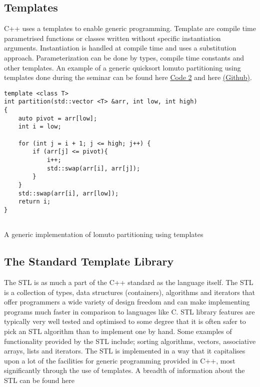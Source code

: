 \documentclass[conference, a4paper]{IEEEtran}
\begin{document}
\subsection{Templates}

C++ uses a templates to enable generic programming. Template are compile time parametrised functions or classes written without specific instantiation arguments. Instantiation is handled at compile time and uses a substitution approach. Parameterization can be done by types, compile time constants and other templates. An example of a generic quicksort lomuto partitioning using templates done during the seminar can be found here \hyperref[listing:2]{Code 2} and here \href{https://github.com/qasimwarraich/PLP/blob/master/A2/Task1/quicksort/quicksort.cpp}{(Github)}.


\begin{listing}[htb]
\begin{verbatim}
template <class T>
int partition(std::vector <T> &arr, int low, int high)
{
    auto pivot = arr[low];
    int i = low;

    for (int j = i + 1; j <= high; j++) {
        if (arr[j] <= pivot){
            i++;
            std::swap(arr[i], arr[j]);
        }
    }
    std::swap(arr[i], arr[low]);
    return i; 
}
        
    \end{verbatim}
    
    \caption{A generic implementation of lomuto partitioning using templates}
\label{listing:2}
\end{listing}

\subsection{The Standard Template Library}
The STL is as much a part of the C++ standard as the language itself. The STL is a collection of types, data structures (containers), algorithms and iterators that offer programmers a wide variety of design freedom and can make implementing programs much faster in comparison to languages like C. STL library features are typically very well tested and optimised to some degree that it is often safer to pick an STL algorithm than to implement one by hand. Some examples of functionality provided by the STL include; sorting algorithms, vectors, associative arrays, lists and iterators. The STL is implemented in a way that it capitalises upon a lot of the facilities for generic programming provided in C++, most significantly through the use of templates. A breadth of information about the STL can be found here \cite{josuttis2012c++}
\end{document}
